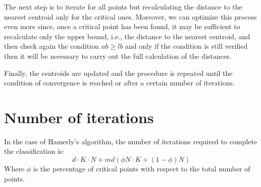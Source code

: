 \documentclass{report}
\begin{document}
\begin{minipage}[b]{0.48\textwidth}
  The next step is to iterate for all points but recalculating the distance to the nearest centroid only for the critical ones. Moreover, we can optimize this process even more since, once a critical point has been found, it may be sufficient to recalculate only the upper bound, i.e., the distance to the nearest centroid, and then check again the condition $ub \geq lb$ and only if the condition is still verified then it will be necessary to carry out the full calculation of the distances.
  
  Finally, the centroids are updated and the procedure is repeated until the condition of convergence is reached or after a certain number of iterations.

  \section*{Number of iterations}
  In the case of Hamerly's algorithm, the number of iterations required to complete the classification is:
  \begin{equation}
      d\cdot K\cdot N + md(\phi N\cdot K + (1 - \phi)N)
  \end{equation}
  Where $\phi$ is the percentage of critical points with respect to the total number of points.
\end{minipage}

\newpage
\end{document}
